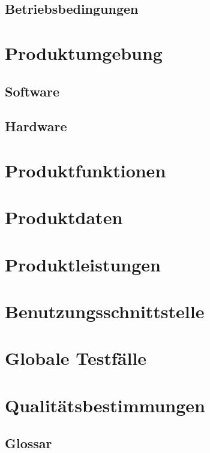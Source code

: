 \documentclass[a4paper]{scrreprt}
\begin{document}
\section{Betriebsbedingungen}

\chapter{Produktumgebung}

\section{Software}

\section{Hardware}

\chapter{Produktfunktionen}

\chapter{Produktdaten}

\chapter{Produktleistungen}

\chapter{Benutzungsschnittstelle}

\chapter{Globale Testfälle}

\chapter{Qualitätsbestimmungen}

\begin{appendices}
\chapter{Glossar}
\end{appendices}

\listoffigures
\end{document}
